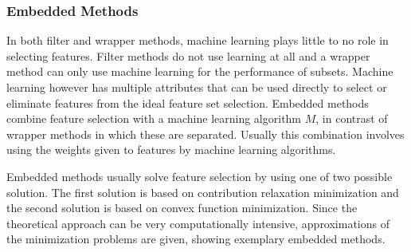\documentclass[10pt,a4paper]{article}
\begin{document}
	\subsubsection{Embedded Methods}
	\label{subsec:EmbeddedMethods}
	
	In both filter and wrapper methods, machine learning plays little to no role in selecting features. Filter methods do not use learning at all and a wrapper method can only use machine learning for the performance of subsets. Machine learning however has multiple attributes that can be used directly to select or eliminate features from the ideal feature set selection. Embedded methods combine feature selection with a machine learning algorithm $M$, in contrast of wrapper methods in which these are separated\cite{Lal2006}. Usually this combination involves using the weights given to features by machine learning algorithms\cite{blum1997selection}.
	
	Embedded methods usually solve feature selection by using one of two possible solution. The first solution is based on contribution relaxation minimization and the second solution is based on convex function minimization. Since the theoretical approach can be very computationally intensive, approximations of the minimization problems are given, showing exemplary embedded methods\cite{Lal2006}.
	
\end{document}
